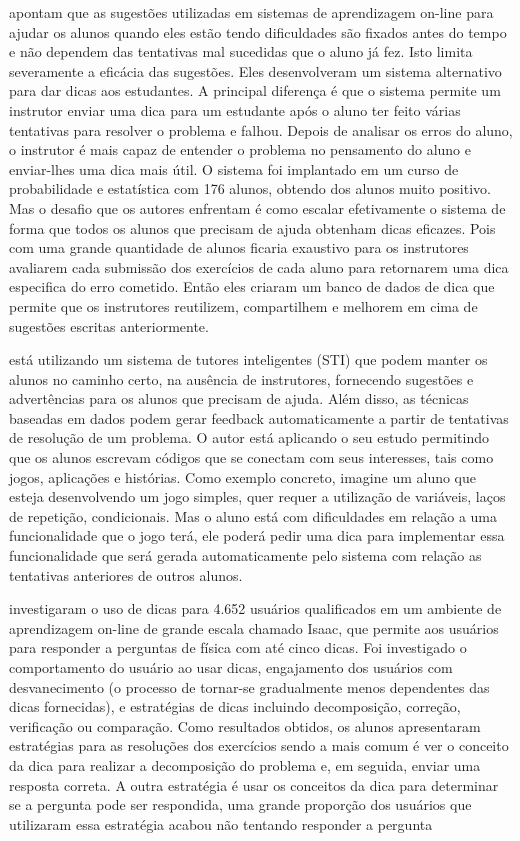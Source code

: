  apontam que as sugestões utilizadas em sistemas de aprendizagem on-line para ajudar os alunos quando eles estão tendo dificuldades são fixados antes do tempo e não dependem das tentativas mal sucedidas que o aluno já fez. Isto limita severamente a eficácia das sugestões. Eles desenvolveram um sistema alternativo para dar dicas aos estudantes. A principal diferença é que o sistema permite um instrutor enviar uma dica para um estudante após o aluno ter feito várias tentativas para resolver o problema e falhou. Depois de analisar os erros do aluno, o instrutor é mais capaz de entender o problema no pensamento do aluno e enviar-lhes uma dica mais útil. O sistema foi implantado em um curso de probabilidade e estatística com 176 alunos, obtendo  dos alunos muito positivo. Mas o desafio que os autores enfrentam é como escalar efetivamente o sistema de forma que todos os alunos que precisam de ajuda obtenham dicas eficazes. Pois com uma grande quantidade de alunos ficaria exaustivo para os instrutores avaliarem cada submissão dos exercícios de cada aluno para retornarem uma dica especifica do erro cometido. Então eles criaram um banco de dados de dica que permite que os instrutores reutilizem, compartilhem e melhorem em cima de sugestões escritas anteriormente.

 está utilizando um sistema de tutores inteligentes (STI) que podem manter os alunos no caminho certo, na ausência de instrutores, fornecendo sugestões e advertências para os alunos que precisam de ajuda. Além disso, as técnicas baseadas em dados podem gerar feedback automaticamente a partir de tentativas de resolução de um problema. O autor está aplicando o seu estudo permitindo que os alunos escrevam códigos que se conectam com seus interesses, tais como jogos, aplicações e histórias. Como exemplo concreto, imagine um aluno que esteja desenvolvendo um jogo simples, quer requer a utilização de variáveis, laços de repetição, condicionais. Mas o aluno está com dificuldades em relação a uma funcionalidade que o jogo terá, ele poderá pedir uma dica para implementar essa funcionalidade que será gerada automaticamente pelo sistema com relação as tentativas anteriores de outros alunos.

 investigaram  o uso de dicas para 4.652 usuários qualificados em um ambiente de aprendizagem on-line de grande escala chamado Isaac, que permite aos usuários para responder a perguntas de física com até cinco dicas. Foi investigado o comportamento do usuário ao usar dicas, engajamento dos usuários com desvanecimento (o processo de tornar-se gradualmente menos dependentes das dicas fornecidas), e estratégias de dicas incluindo decomposição, correção, verificação ou comparação. Como resultados obtidos, os alunos apresentaram estratégias para as resoluções dos exercícios sendo a mais comum é ver o conceito da dica para realizar a decomposição do problema e, em seguida, enviar uma resposta correta. A outra estratégia é usar os conceitos da dica para determinar se a pergunta pode ser respondida, uma grande proporção dos usuários que utilizaram essa estratégia acabou não tentando responder a pergunta


